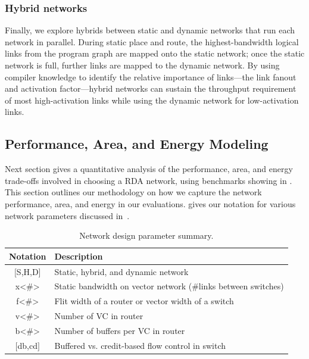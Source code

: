 \subsubsection{Hybrid networks}
Finally, we explore hybrids between static and dynamic networks that run each network in parallel. 
During static place and route, the highest-bandwidth logical links from the program graph are mapped onto the static network; once the static network is full, further links are mapped to the dynamic network.
By using compiler knowledge to identify the relative importance of links---the link fanout and activation factor---hybrid networks can sustain the throughput requirement of most high-activation links while using the dynamic network for low-activation links.

\subsection{Performance, Area, and Energy Modeling} \label{sec:net_char}

Next section gives a quantitative analysis of the performance, area, and energy trade-offs involved 
in choosing a RDA network, using benchmarks showing in .
This section outlines our methodology on how we capture the network performance, area, and energy in our evaluations.
 gives our notation for various network parameters discussed
in~.

\begin{table}
\footnotesize
  \centering
\begin{tabular*}{0.65\textwidth}{c l}
  \bottomrule
  \textbf{Notation} & \textbf{Description} \\\midrule
  $[$S,H,D$]$ & Static, hybrid, and dynamic network \\\midrule
  x<\#> & Static bandwidth on vector network (\#links between switches) \\\midrule
  f<\#> & Flit width of a router or vector width of a switch \\\midrule
  v<\#> & Number of VC in router \\\midrule
  b<\#> & Number of buffers per VC in router \\\midrule
  $[$db,cd$]$ & Buffered vs. credit-based flow control in switch \\\midrule
\end{tabular*}
  \caption[Network design parameter summary]{Network design parameter summary.}
\label{tab:notation}
\end{table}

